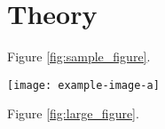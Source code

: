 \documentclass[9pt]{AEGC2021}
\begin{document}
\setlength{\columnsep}{1cm}
\begin{multicols}{2}


\shortAbstract
{
\blindtext[3]
}

\section{Theory}%
\blindtext
Figure \ref{fig:sample_figure}.

\blindtext

\begin{figurehere}
 \centering
 \texttt{[image: example-image-a]}
 \label{fig:sample_figure}
\end{figurehere}

\blindtext Figure \ref{fig:large_figure}.


\blindtext
\cite{CitekeyArticle, CitekeyBook, CitekeyMastersthesis}

\end{multicols}
\restoregeometry
\setlength{\columnsep}{1cm}
\end{document}
